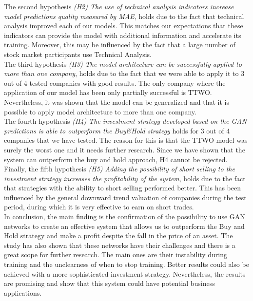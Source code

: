 \documentclass[review]{elsarticle} %
\begin{document}
The second hypothesis\textit{ (H2) The use of technical analysis indicators increase model predictions quality measured by MAE}, holds due to the fact that technical analysis improved each of our models. This matches our expectations that these indicators can provide the model with additional information and accelerate its training. Moreover, this may be influenced by the fact that a large number of stock market participants use Technical Analysis.\\

The third hypothesis\textit{ (H3) The model architecture can be successfully applied to more than one company}, holds due to the fact that we were able to apply it to 3 out of 4 tested companies with good results. The only company where the application of our model has been only partially successful is TTWO. Nevertheless, it was shown that the model can be generalized and that it is possible to apply model architecture to more than one company.\\

The fourth hypothesis\textit{ (H4) The investment strategy developed based on the GAN predictions is able to outperform the Buy\&Hold strategy} holds for 3 out of 4 companies that we have tested. The reason for this is that the TTWO model was surely the worst one and it needs further research. Since we have shown that the system can outperform the buy and hold approach, H4 cannot be rejected.\\

Finally, the fifth hypothesis\textit{ (H5) Adding the possibility of short selling to the investment strategy increases the profitability of the system}, holds due to the fact that strategies with the ability to short selling performed better.  This has been influenced by the general downward trend valuation of companies during the test period, during which it is very effective to earn on short trades.\\

In conclusion, the main finding is the confirmation of the possibility to use GAN networks to create an effective system that allows us to outperform the Buy and Hold strategy and make a profit despite the fall in the price of an asset. The study has also shown that these networks have their challenges and there is a great scope for further research. The main ones are their instability during training and the unclearness of when to stop training.  Better results could also be achieved with a more sophisticated investment strategy. Nevertheless, the results are promising and show that this system could have potential business applications.
\end{document}
